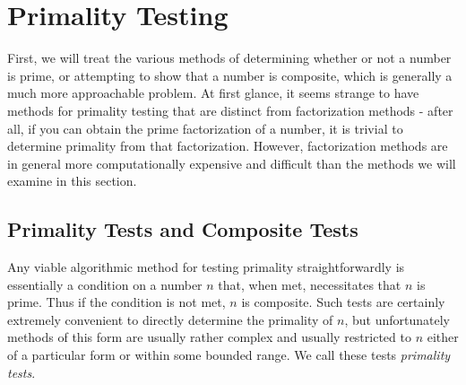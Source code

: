 \documentclass{article}
\begin{document}


\newpage

\section{Primality Testing}\label{Primality}

\par First, we will treat the various methods of determining whether or not a number is prime, or attempting to show that a number is composite, which is generally a much more approachable problem. At first glance, it seems strange to have methods for primality testing that are distinct from factorization methods - after all, if you can obtain the prime factorization of a number, it is trivial to determine primality from that factorization. However, factorization methods are in general more computationally expensive and difficult than the methods we will examine in this section. 


\subsection*{ Primality Tests and Composite Tests }

\par Any viable algorithmic method for testing primality straightforwardly is essentially a condition on a number $n$ that, when met, necessitates that $n$ is prime. Thus if the condition is not met, $n$ is composite. Such tests are certainly extremely convenient to directly determine the primality of $n$, but unfortunately methods of this form are usually rather complex and usually restricted to $n$ either of a particular form or within some bounded range. We call these tests \textit{primality tests}.
\end{document}
